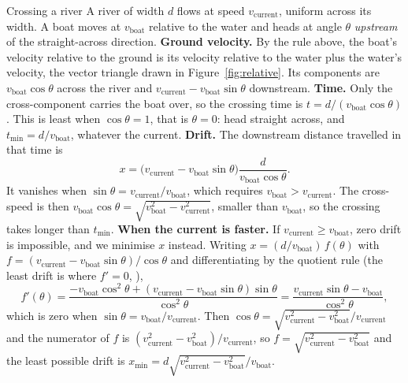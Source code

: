 \begin{derivbox}{Crossing a river}
A river of width $d$ flows at speed $v_{\text{current}}$, uniform across its width. A boat moves at
$v_{\text{boat}}$ relative to the water and heads at angle $\theta$ \emph{upstream} of the
straight-across direction.
 \textbf{Ground velocity.} By the rule above, the boat's velocity relative to the ground is its
velocity relative to the water plus the water's velocity, the vector triangle drawn in
Figure~\ref{fig:relative}. Its components are $v_{\text{boat}}\cos\theta$
across the river and $v_{\text{current}}-v_{\text{boat}}\sin\theta$ downstream.
 \textbf{Time.} Only the cross-component carries the boat over, so the crossing time is
$t=d/(v_{\text{boat}}\cos\theta)$. This is least when $\cos\theta=1$, that is $\theta=0$: head straight
across, and $t_{\min}=d/v_{\text{boat}}$, whatever the current.
 \textbf{Drift.} The downstream distance travelled in that time is
\[
x=\big(v_{\text{current}}-v_{\text{boat}}\sin\theta\big)\frac{d}{v_{\text{boat}}\cos\theta}.
\]
It vanishes when $\sin\theta=v_{\text{current}}/v_{\text{boat}}$, which requires
$v_{\text{boat}}>v_{\text{current}}$. The cross-speed is then
$v_{\text{boat}}\cos\theta=\sqrt{v_{\text{boat}}^2-v_{\text{current}}^2}$, smaller than $v_{\text{boat}}$,
so the crossing takes longer than $t_{\min}$.
 \textbf{When the current is faster.} If $v_{\text{current}}\ge v_{\text{boat}}$, zero drift is
impossible, and we minimise $x$ instead. Writing $x=(d/v_{\text{boat}})\,f(\theta)$ with
$f=(v_{\text{current}}-v_{\text{boat}}\sin\theta)/\cos\theta$ and differentiating by the quotient rule
(the least drift is where $f'=0$, ),
\[
f'(\theta)=\frac{-v_{\text{boat}}\cos^2\theta+(v_{\text{current}}-v_{\text{boat}}\sin\theta)\sin\theta}{\cos^2\theta}
=\frac{v_{\text{current}}\sin\theta-v_{\text{boat}}}{\cos^2\theta},
\]
which is zero when $\sin\theta=v_{\text{boat}}/v_{\text{current}}$. Then
$\cos\theta=\sqrt{v_{\text{current}}^2-v_{\text{boat}}^2}\big/v_{\text{current}}$ and the numerator of $f$ is
$(v_{\text{current}}^2-v_{\text{boat}}^2)/v_{\text{current}}$, so $f=\sqrt{v_{\text{current}}^2-v_{\text{boat}}^2}$
and the least possible drift is $x_{\min}=d\sqrt{v_{\text{current}}^2-v_{\text{boat}}^2}\big/v_{\text{boat}}$.
\end{derivbox}

